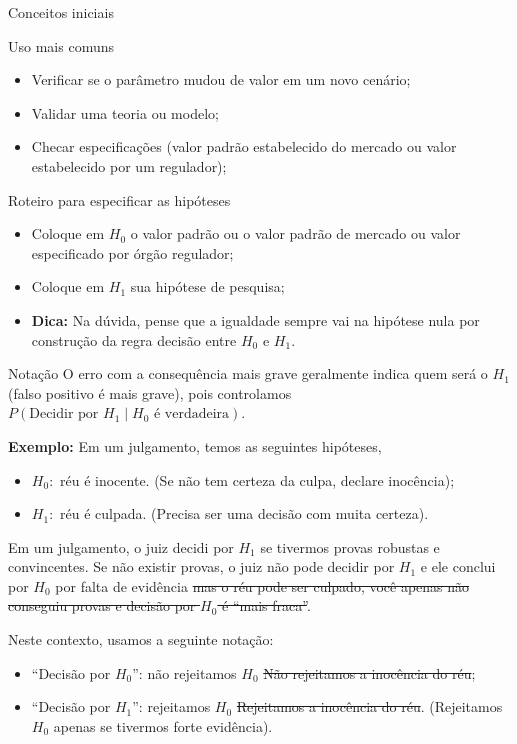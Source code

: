 \documentclass[8pt]{beamer}
\begin{document}
\begin{frame}{Conceitos iniciais}

\scriptsize

\begin{block}{Uso mais comuns}
	\begin{itemize}
		\item Verificar se o parâmetro mudou de valor em um novo cenário;
		\item Validar uma teoria ou modelo;
		\item Checar especificações (valor padrão estabelecido do mercado ou valor estabelecido por um  regulador);
	\end{itemize}
\end{block}
\vfill

\begin{block}{Roteiro para especificar as hipóteses}
	\begin{itemize}
		\item \textcolor{important}{Coloque em $H_0$ o valor padrão ou o valor padrão de mercado ou valor especificado por órgão regulador;}
		\item \textcolor{important}{Coloque em $H_1$ sua hipótese de pesquisa};
		\item \textbf{Dica:} Na dúvida, pense que a igualdade sempre vai na hipótese nula por construção da regra decisão entre $H_0$ e $H_1$.
	\end{itemize}	 
\end{block}

\begin{block}{Notação}
	\textcolor{important}{O erro com a consequência mais grave geralmente indica quem será o $H_1$ (falso positivo é mais grave)}, pois controlamos $P(\mbox{Decidir por }H_1 \mid H_0\mbox{ é verdadeira})$.

	\textbf{Exemplo:} Em um julgamento, temos as seguintes hipóteses,
	\begin{itemize}
		\item $H_0:$ réu é inocente. (Se não tem certeza da culpa, declare inocência);
		\item $H_1:$ réu  é culpada. (Precisa ser uma decisão com muita certeza).
	\end{itemize}
	Em um julgamento, o juiz decidi por $H_1$ se tivermos provas robustas e convincentes. Se não existir provas, o juiz não pode decidir por $H_1$ e ele conclui por $H_0$ por falta de evidência \sout{mas o réu pode ser culpado, você apenas não conseguiu provas e decisão por $H_0$ é ``mais fraca''}.
	
	Neste contexto, usamos a seguinte notação:
	\begin{itemize}
		\item ``Decisão por $H_0$'': não rejeitamos $H_0$ \sout{Não rejeitamos a inocência do réu};
		\item ``Decisão por $H_1$'': rejeitamos $H_0$ \sout{Rejeitamos a inocência do réu}. (Rejeitamos $H_0$ apenas se tivermos forte evidência).
	\end{itemize}
\end{block}

\normalsize

\end{frame}
\end{document}
